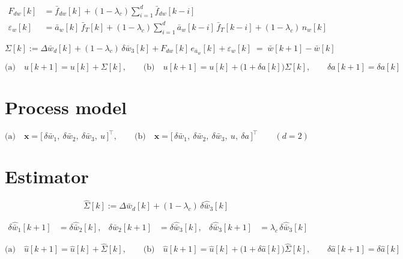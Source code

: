 \documentclass[11pt,a4paper,fontset=none]{ctexart}
\newcommand{\ba}{\bar{a}}
\newcommand{\bw}{\bar{w}}
\begin{document}
\begin{align*}
F_{dw}[k] &= \bar{f}_{dw}[k] + (1-\lambda_c)\sum_{i=1}^{d}\bar{f}_{dw}[k-i] \\
\varepsilon_w[k] &= \ba_w[k]\,\bar{f}_T[k]
  + (1-\lambda_c)\sum_{i=1}^{d}\ba_w[k-i]\,\bar{f}_T[k-i]
  + (1-\lambda_c)\,n_w[k]
\end{align*}

\begin{equation*}
\Sigma[k] := \Delta\bw_d[k] + (1-\lambda_c)\,\delta\bw_3[k]
  + F_{dw}[k]\,e_{\ba_w}[k] + \varepsilon_w[k]
  \;=\; \bw[k+1] - \bw[k]
\end{equation*}

\begin{equation*}
\text{(a)}\quad u[k+1] = u[k] + \Sigma[k],
\qquad
\text{(b)}\quad u[k+1] = u[k] + \bigl(1+\delta a[k]\bigr)\Sigma[k],
\qquad
\delta a[k+1] = \delta a[k]
\end{equation*}

\section{Process model}

\begin{equation*}
\text{(a)}\quad
\mathbf{x} = \bigl[\,\delta\bw_1,\ \delta\bw_2,\ \delta\bw_3,\ u\,\bigr]^{\top},
\qquad
\text{(b)}\quad
\mathbf{x} = \bigl[\,\delta\bw_1,\ \delta\bw_2,\ \delta\bw_3,\ u,\
\delta a\,\bigr]^{\top}
\qquad (d = 2)
\end{equation*}

\section{Estimator}

\begin{equation*}
\hat{\Sigma}[k] := \Delta\bw_d[k] + (1-\lambda_c)\,\delta\hat{\bw}_3[k]
\end{equation*}

\begin{align*}
\delta\hat{\bw}_1[k+1] &= \delta\hat{\bw}_2[k], &
\delta\hat{\bw}_2[k+1] &= \delta\hat{\bw}_3[k], &
\delta\hat{\bw}_3[k+1] &= \lambda_c\,\delta\hat{\bw}_3[k]
\end{align*}

\begin{equation*}
\text{(a)}\quad \hat{u}[k+1] = \hat{u}[k] + \hat{\Sigma}[k],
\qquad
\text{(b)}\quad \hat{u}[k+1] = \hat{u}[k]
  + \bigl(1+\delta\hat{a}[k]\bigr)\hat{\Sigma}[k],
\qquad
\delta\hat{a}[k+1] = \delta\hat{a}[k]
\end{equation*}
\end{document}
